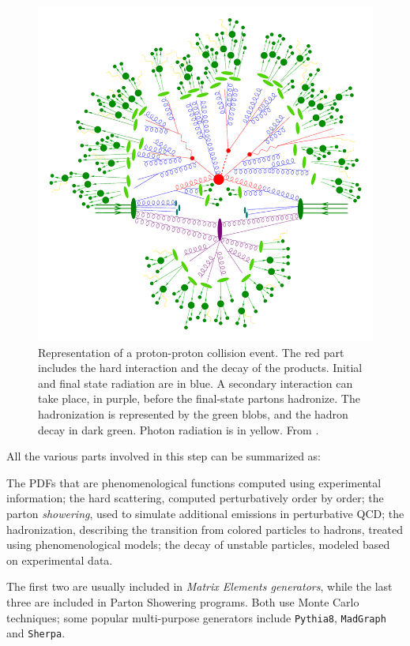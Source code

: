 \begin{figure}
    \centering
     \includegraphics[width=.65\linewidth]{gfx/ch2/event_800px.png}
    \caption[Event generation]{ Representation of a proton-proton collision event. The red part includes the hard interaction and the decay of the products. Initial and final state radiation are in blue. A secondary
interaction can take place, in purple, before the final-state partons hadronize. The hadronization is
represented by the green blobs, and the hadron decay in dark green. Photon radiation is in yellow. From \cite{evgen}.}
    \label{fig:evgen}
\end{figure}


All the various parts involved in this step can be summarized as:

\begin{outline}
    \1  The PDFs that are phenomenological functions computed using experimental information;
    \1  the hard scattering, computed perturbatively order by order;
    \1  the parton \emph{showering}, used to simulate additional emissions in perturbative QCD;
    \1   the hadronization, describing the transition from colored particles to hadrons, treated
        using phenomenological models;
    \1   the decay of unstable particles, modeled based on experimental data.
    
\end{outline}

The first two are usually included in \emph{Matrix Elements generators}, while the last three are
included in Parton Showering programs. Both use Monte Carlo techniques; some popular multi-purpose generators include \texttt{Pythia8}, \texttt{MadGraph} and \texttt{Sherpa}.

